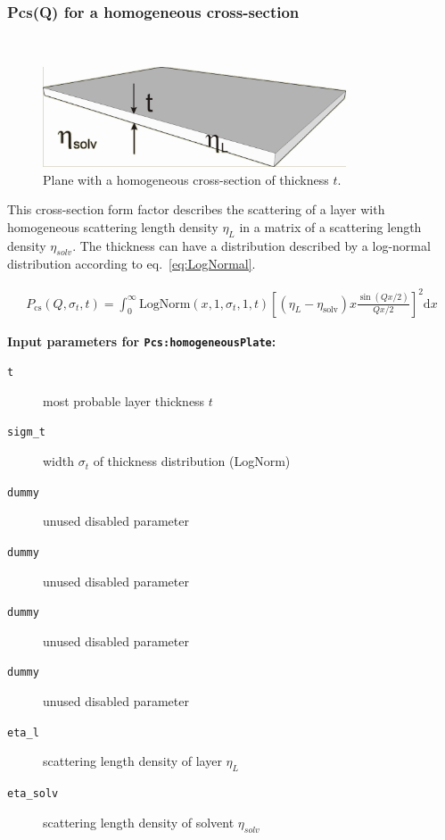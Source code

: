 \clearpage

\subsubsection{Pcs(Q) for a homogeneous cross-section}
\label{plugin:Pcs:homogeneousXS} ~\\

\begin{figure}[htb]
\begin{center}
\includegraphics[width=0.802\textwidth,height=0.265\textwidth]{../images/form_factor/anisotropic/Pcs_homogeneousXS_txt.png}
\end{center}
\caption{Plane with a homogeneous cross-section of thickness $t$.}
\label{fig:homogeneousXS}
\end{figure}

This cross-section form factor describes the scattering of a layer with homogeneous
scattering length density $\eta_L$ in a matrix of a scattering length density $\eta_{solv}$.
The thickness can have a distribution described by a log-normal distribution according to eq.\ \ref{eq:LogNormal}.

\begin{align}
P_\text{cs}(Q,\sigma_{t},t) = \int_0^\infty \textrm{LogNorm}(x,1,\sigma_{t},1,t)
    \left[ \left(\eta_L-\eta_\textrm{solv}\right) x \frac{\sin(Qx/2)}{Qx/2} \right]^2\textrm{d}x
\end{align}

\noindent
\textbf{Input parameters for \texttt{Pcs:homogeneousPlate}:}
\begin{description}
    \item[\texttt{t}] most probable layer thickness $t$
    \item[\texttt{sigm\_t}] width $\sigma_t$ of thickness distribution (LogNorm)
    \item[\texttt{dummy}] unused disabled parameter
    \item[\texttt{dummy}] unused disabled parameter
    \item[\texttt{dummy}] unused disabled parameter
    \item[\texttt{dummy}] unused disabled parameter
    \item[\texttt{eta\_l}] scattering length density of layer $\eta_L$
    \item[\texttt{eta\_solv}] scattering length density of solvent $\eta_{solv}$
\end{description}

